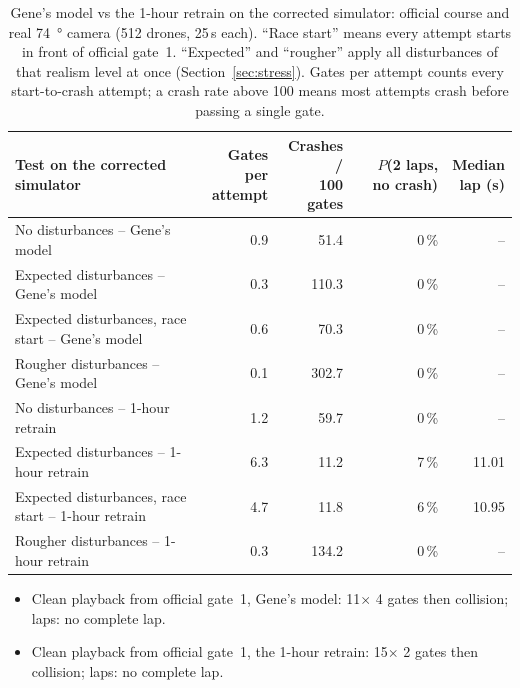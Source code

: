 \begin{table}[H]\centering\footnotesize
\begin{tabularx}{\linewidth}{@{}Xrrrr@{}}
\toprule
Test on the corrected simulator & \makecell{Gates per\\attempt} & \makecell{Crashes /\\100 gates} & \makecell{$P$(2 laps,\\no crash)} & \makecell{Median\\lap (s)} \\
\midrule
No disturbances -- Gene's model & 0.9 & 51.4 & 0\,\% & -- \\
Expected disturbances -- Gene's model & 0.3 & 110.3 & 0\,\% & -- \\
Expected disturbances, race start -- Gene's model & 0.6 & 70.3 & 0\,\% & -- \\
Rougher disturbances -- Gene's model & 0.1 & 302.7 & 0\,\% & -- \\
No disturbances -- 1-hour retrain & 1.2 & 59.7 & 0\,\% & -- \\
Expected disturbances -- 1-hour retrain & 6.3 & 11.2 & 7\,\% & 11.01 \\
Expected disturbances, race start -- 1-hour retrain & 4.7 & 11.8 & 6\,\% & 10.95 \\
Rougher disturbances -- 1-hour retrain & 0.3 & 134.2 & 0\,\% & -- \\
\bottomrule
\end{tabularx}
\caption{Gene's model vs the 1-hour retrain on the corrected simulator: official course and real \SI{74}{\degree} camera (512 drones, 25\,s each). ``Race start'' means every attempt starts in front of official gate~1. ``Expected'' and ``rougher'' apply all disturbances of that realism level at once (Section~\ref{sec:stress}). Gates per attempt counts every start-to-crash attempt; a crash rate above 100 means most attempts crash before passing a single gate.}\label{tab:retrain}
\end{table}
\begin{itemize}
\item Clean playback from official gate~1, Gene's model: 11$\times$ 4 gates then collision; laps: no complete lap.
\item Clean playback from official gate~1, the 1-hour retrain: 15$\times$ 2 gates then collision; laps: no complete lap.
\end{itemize}
